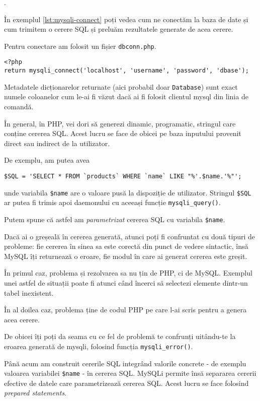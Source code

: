 .

În exemplul \ref{lst:mysqli-connect} poți vedea cum ne conectăm la
baza de date și cum trimitem o cerere SQL și preluăm rezultatele
generate de acea cerere.

Pentru conectare am folosit un fișier \texttt{dbconn.php}.
\begin{lstlisting}[caption={dbconn.php}]
<?php
return mysqli_connect('localhost', 'username', 'password', 'dbase');
\end{lstlisting}

Metadatele dicționarelor returnate (aici probabil
doar \texttt{Database}) sunt exact numele coloanelor cum le-ai fi
văzut dacă ai fi folosit clientul mysql din linia de comandă.

În general, în PHP, vei dori să generezi dinamic, programatic, stringul
care conține cererea SQL. Acest lucru se face de obicei pe baza inputului
provenit direct sau indirect de la utilizator.

De exemplu, am putea avea

\begin{lstlisting}
$SQL = 'SELECT * FROM `products` WHERE `name` LIKE "%'.$name.'%"';
\end{lstlisting}

unde variabila \texttt{\$name} are o valoare pusă la dispoziție de utilizator.
Stringul \texttt{\$SQL} ar putea fi trimis apoi daemonului cu aceeași
funcție \texttt{mysqli\_query()}.

Putem spune că astfel am \textsl{parametrizat} cererea SQL cu variabila
\texttt{\$name}.

Dacă ai o greșeală în cererea generată, atunci poți fi
confruntat cu două tipuri de probleme: fie cererea în sinea sa este corectă
din punct de vedere sintactic, însă MySQL îți returnează o eroare, fie
modul în care ai generat cererea este greșit.

În primul caz, problema și rezolvarea sa nu țin de PHP, ci de MySQL.
Exemplul unei astfel de situații poate fi atunci când încerci să
selectezi elemente dintr-un tabel inexistent.

În al doilea caz, problema ține de codul PHP pe care l-ai scris
pentru a genera acea cerere.

De obicei îți poți da seama cu ce fel de problemă te confrunți uitându-te
la eroarea generată de mysqli, folosind funcția \texttt{mysqli\_error()}.

Până acum am construit cererile SQL integrând valorile concrete - de exemplu
valoarea variabilei \texttt{\$name} - în cererea SQL. MySQLi permite
însă separarea cererii efective de datele care parametrizează cererea
SQL. Acest lucru se face folosind \textsl{prepared statements}.

